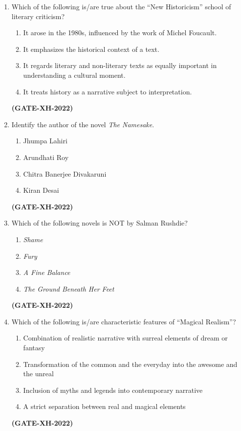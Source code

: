 \documentclass[journal]{IEEEtran}
\begin{document}
\begin{enumerate}
\item Which of the following is/are true about the ``New Historicism'' school of literary criticism?
\begin{enumerate}
\item It arose in the 1980s, influenced by the work of Michel Foucault.
\item It emphasizes the historical context of a text.
\item It regards literary and non-literary texts as equally important in understanding a cultural moment.
\item It treats history as a narrative subject to interpretation.
\end{enumerate}
\hfill\textbf{(GATE-XH-2022)}

\item Identify the author of the novel \textit{The Namesake}.
\begin{multicols}{2}
\begin{enumerate}
\item Jhumpa Lahiri
\item Arundhati Roy
\item Chitra Banerjee Divakaruni
\item Kiran Desai
\end{enumerate}
\end{multicols}
\hfill\textbf{(GATE-XH-2022)}

\item Which of the following novels is NOT by Salman Rushdie?
\begin{multicols}{2}
\begin{enumerate}
\item \textit{Shame}
\item \textit{Fury}
\item \textit{A Fine Balance}
\item \textit{The Ground Beneath Her Feet}
\end{enumerate}
\end{multicols}
\hfill\textbf{(GATE-XH-2022)}

\item Which of the following is/are characteristic features of ``Magical Realism''?
\begin{enumerate}
\item Combination of realistic narrative with surreal elements of dream or fantasy
\item Transformation of the common and the everyday into the awesome and the unreal
\item Inclusion of myths and legends into contemporary narrative
\item A strict separation between real and magical elements
\end{enumerate}
\hfill\textbf{(GATE-XH-2022)}


\end{enumerate}
\end{document}
